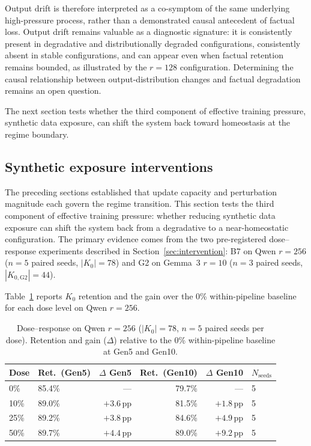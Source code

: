 \documentclass[a4paper,fleqn]{cas-dc}
\newif\ifshowchanges
\newcommand{\rev}[1]{\ifshowchanges{\color{blue}#1}\else{#1}\fi}
\begin{document}
Output drift is therefore interpreted as a co-symptom of the same underlying
high-pressure process, rather than a demonstrated causal antecedent of factual
loss. Output drift remains valuable as a diagnostic signature: it is
consistently present in degradative and distributionally degraded configurations,
consistently absent in stable configurations, and can appear even when factual
retention remains bounded, as illustrated by the $r=128$ configuration.
Determining the causal relationship between output-distribution changes and
factual degradation remains an open question.

The next section tests whether the third component of effective training
pressure, synthetic data exposure, can shift the system back toward homeostasis
at the regime boundary.

\subsection{Synthetic exposure interventions}\label{sec:res_intervention}

The preceding sections established that update capacity and perturbation
magnitude each govern the regime transition. This section tests the third
component of effective training pressure: whether reducing synthetic data
exposure can shift the system back from a degradative to a near-homeostatic
configuration. The primary evidence comes from the two pre-registered
dose--response experiments described in Section~\ref{sec:intervention}:
B7 on Qwen $r=256$ ($n=5$ paired seeds, $|K_0|=78$) and G2 on Gemma~3 $r=10$
($n=3$ paired seeds, $|K_{0,\mathrm{G2}}|=44$).

\rev{Table~\ref{tab:interventions} reports $K_0$ retention and the gain over
the 0\% within-pipeline baseline for each dose level on Qwen $r=256$.}

\begin{table}[width=.95\linewidth,cols=6,pos=htbp]
\caption{\rev{Dose--response on Qwen $r=256$ ($|K_0|=78$, $n=5$ paired seeds per
dose). Retention and gain ($\Delta$) relative to the 0\% within-pipeline
baseline at Gen5 and Gen10.}}\label{tab:interventions}
\begin{tabular*}{\tblwidth}{@{} llrrrl@{} }
\toprule
\rev{Dose} & \rev{Ret.\ (Gen5)} & \rev{$\Delta$ Gen5} & \rev{Ret.\ (Gen10)} & \rev{$\Delta$ Gen10} & \rev{$N_\mathrm{seeds}$} \\
\midrule
0\%  & \rev{85.4\%} & ---             & \rev{79.7\%} & ---             & 5 \\
10\% & 89.0\% & \rev{$+3.6$}\,pp & \rev{81.5\%} & \rev{$+1.8$}\,pp & 5 \\
25\% & 89.2\% & \rev{$+3.8$}\,pp & 84.6\% & \rev{$+4.9$}\,pp & 5 \\
50\% & 89.7\% & \rev{$+4.4$}\,pp & \rev{89.0\%} & \rev{$+9.2$}\,pp & 5 \\
\bottomrule
\end{tabular*}
\end{table}
\end{document}
